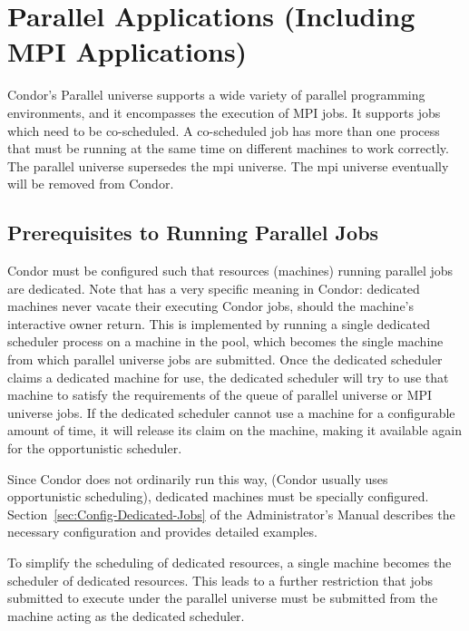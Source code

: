 \section{\label{sec:Parallel}Parallel Applications (Including MPI Applications)}

Condor's Parallel universe supports a wide variety of parallel
programming environments, and it encompasses the execution 
of MPI jobs.
It supports jobs which need to be co-scheduled.
A co-scheduled job has
more than one process that must be running at the same time on different
machines to work correctly.
The parallel universe supersedes the mpi universe.
The mpi universe eventually will be removed from Condor.


\subsection{\label{sec:parallel-setup}Prerequisites to Running Parallel Jobs}

Condor must be configured such that resources (machines) running
parallel jobs are dedicated.  
Note that  has a very specific meaning in Condor:
dedicated
machines never vacate their executing Condor jobs,
should the machine's interactive owner return.
This is implemented by running a single dedicated scheduler
process on a machine in the pool,
which becomes the single machine from which parallel universe
jobs are submitted.
Once the dedicated scheduler claims a
dedicated machine for use, 
the dedicated scheduler will try to use that machine to satisfy
the requirements of the queue of parallel universe or MPI universe jobs.
If the dedicated scheduler cannot use a machine for a
configurable amount of time, it will release its claim on the machine,
making it available again for the opportunistic scheduler.

Since Condor does not ordinarily run this way, (Condor usually uses
opportunistic scheduling), dedicated machines must be specially
configured.  Section~\ref{sec:Config-Dedicated-Jobs} of the
Administrator's Manual describes the necessary configuration and
provides detailed examples.

To simplify the scheduling of dedicated resources, a single machine
becomes the scheduler of dedicated resources.  This leads to a further
restriction that jobs submitted to execute under the parallel universe
must be submitted from the machine acting as the dedicated scheduler.

